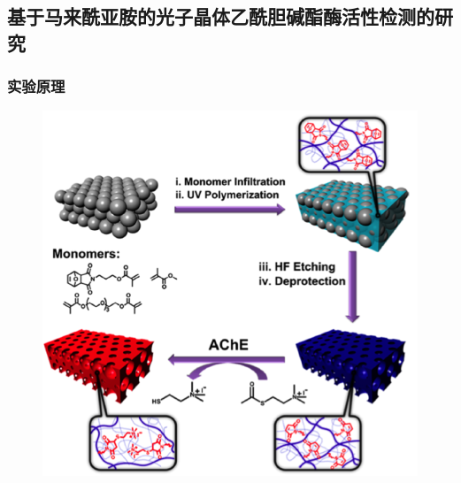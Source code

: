 \documentclass{beamer}
\begin{document}
\subsection{基于马来酰亚胺的光子晶体乙酰胆碱酯酶活性检测的研究}
\begin{frame}
  \frametitle{实验原理}
  \begin{figure}[t]
    \centering
    \includegraphics[height=0.60\linewidth]{figures/ACHe.png}
  \end{figure}
\end{frame}
\end{document}
